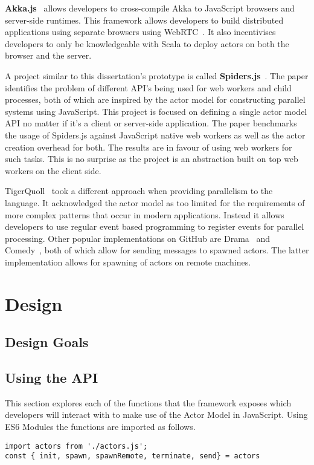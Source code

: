 \documentclass[12pt, a4paper]{report}
\theoremstyle{definition}
\theoremstyle{definition}%
\theoremstyle{definition}%
\theoremstyle{definition}%
\theoremstyle{definition}%
\theoremstyle{definition}%
\begin{document}
\textbf{Akka.js}~\cite{stivan2015akka} allows developers to cross-compile Akka to JavaScript browsers and server-side runtimes. This framework allows developers to build distributed applications using separate browsers using WebRTC~. It also incentivises developers to only be knowledgeable with Scala to deploy actors on both the browser and the server.

A project similar to this dissertation's prototype is called \textbf{Spiders.js}~\cite{spidersjs}. The paper identifies the problem of different API's being used for web workers and child processes, both of which are inspired by the actor model for constructing parallel systems using JavaScript. This project is focused on defining a single actor model API no matter if it's a client or server-side application. The paper benchmarks the usage of Spiders.js against JavaScript native web workers as well as the actor creation overhead for both. The results are in favour of using web workers for such tasks. This is no surprise as the project is an abstraction built on top web workers on the client side.

TigerQuoll~\cite{tigerquoll} took a different approach when providing parallelism to the language. It acknowledged the actor model as too limited for the requirements of more complex patterns that occur in modern applications. Instead it allows developers to use regular event based programming to register events for parallel processing. Other popular implementations on GitHub are Drama~\cite{drama} and Comedy~\cite{comedy}, both of which allow for sending messages to spawned actors. The latter implementation allows for spawning of actors on remote machines.
\chapter{Design}
\section{Design Goals}

\section{Using the API}
This section explores each of the functions that the framework exposes which developers will interact with to make use of the Actor Model in JavaScript. Using ES6 Modules the functions are imported as follows.
\begin{lstlisting}
import actors from './actors.js';
const { init, spawn, spawnRemote, terminate, send} = actors
\end{lstlisting}
\end{document}
